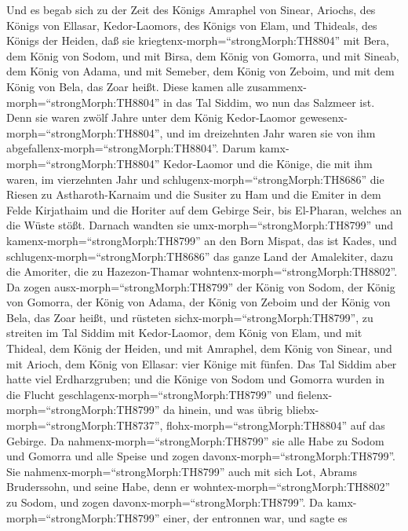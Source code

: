  Und es begab sich zu der Zeit des Königs Amraphel von
Sinear, Ariochs, des Königs von Ellasar, Kedor-Laomors, des Königs von
Elam, und Thideals, des Königs der Heiden,  daß sie
kriegtenx-morph=``strongMorph:TH8804'' mit Bera, dem König von Sodom,
und mit Birsa, dem König von Gomorra, und mit Sineab, dem König von
Adama, und mit Semeber, dem König von Zeboim, und mit dem König von
Bela, das Zoar heißt.  Diese kamen alle
zusammenx-morph=``strongMorph:TH8804'' in das Tal Siddim, wo nun das
Salzmeer ist.  Denn sie waren zwölf Jahre unter dem König
Kedor-Laomor gewesenx-morph=``strongMorph:TH8804'', und im dreizehnten
Jahr waren sie von ihm abgefallenx-morph=``strongMorph:TH8804''.
 Darum kam\textbar x-morph=``strongMorph:TH8804''
Kedor-Laomor und die Könige, die mit ihm waren, im vierzehnten Jahr und
schlugenx-morph=``strongMorph:TH8686'' die Riesen zu Astharoth-Karnaim
und die Susiter zu Ham und die Emiter in dem Felde Kirjathaim
 und die Horiter auf dem Gebirge Seir, bis El-Pharan,
welches an die Wüste stößt.  Darnach wandten sie
umx-morph=``strongMorph:TH8799'' und kamenx-morph=``strongMorph:TH8799''
an den Born Mispat, das ist Kades, und
schlugenx-morph=``strongMorph:TH8686'' das ganze Land der Amalekiter,
dazu die Amoriter, die zu Hazezon-Thamar
wohntenx-morph=``strongMorph:TH8802''.  Da zogen
ausx-morph=``strongMorph:TH8799'' der König von Sodom, der König von
Gomorra, der König von Adama, der König von Zeboim und der König von
Bela, das Zoar heißt, und rüsteten sichx-morph=``strongMorph:TH8799'',
zu streiten im Tal Siddim  mit Kedor-Laomor, dem König von
Elam, und mit Thideal, dem König der Heiden, und mit Amraphel, dem König
von Sinear, und mit Arioch, dem König von Ellasar: vier Könige mit
fünfen.  Das Tal Siddim aber hatte viel Erdharzgruben; und
die Könige von Sodom und Gomorra wurden in die Flucht
geschlagenx-morph=``strongMorph:TH8799'' und
fielenx-morph=``strongMorph:TH8799'' da hinein, und was übrig
bliebx-morph=``strongMorph:TH8737'', flohx-morph=``strongMorph:TH8804''
auf das Gebirge.  Da nahmenx-morph=``strongMorph:TH8799''
sie alle Habe zu Sodom und Gomorra und alle Speise und zogen
davonx-morph=``strongMorph:TH8799''.  Sie
nahmenx-morph=``strongMorph:TH8799'' auch mit sich Lot, Abrams
Bruderssohn, und seine Habe, denn er
wohntex-morph=``strongMorph:TH8802'' zu Sodom, und zogen
davonx-morph=``strongMorph:TH8799''.  Da
kamx-morph=``strongMorph:TH8799'' einer, der entronnen war, und sagte es
